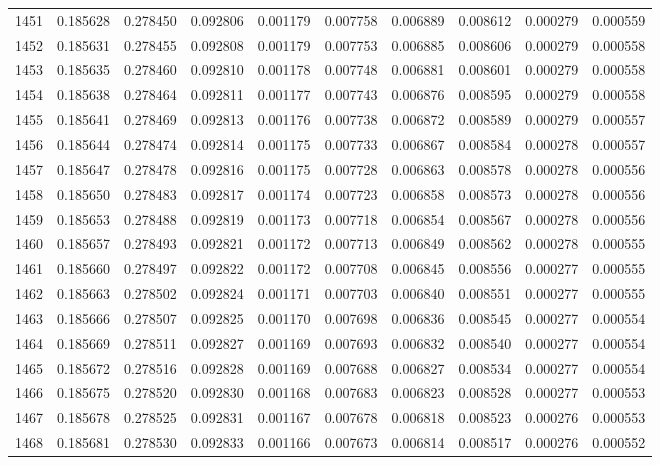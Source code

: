 \begin{tabular}{lrrrrrrrrr}
1451 & 0.185628 & 0.278450 & 0.092806 & 0.001179 & 0.007758 & 0.006889 & 0.008612 & 0.000279 & 0.000559 \\
1452 & 0.185631 & 0.278455 & 0.092808 & 0.001179 & 0.007753 & 0.006885 & 0.008606 & 0.000279 & 0.000558 \\
1453 & 0.185635 & 0.278460 & 0.092810 & 0.001178 & 0.007748 & 0.006881 & 0.008601 & 0.000279 & 0.000558 \\
1454 & 0.185638 & 0.278464 & 0.092811 & 0.001177 & 0.007743 & 0.006876 & 0.008595 & 0.000279 & 0.000558 \\
1455 & 0.185641 & 0.278469 & 0.092813 & 0.001176 & 0.007738 & 0.006872 & 0.008589 & 0.000279 & 0.000557 \\
1456 & 0.185644 & 0.278474 & 0.092814 & 0.001175 & 0.007733 & 0.006867 & 0.008584 & 0.000278 & 0.000557 \\
1457 & 0.185647 & 0.278478 & 0.092816 & 0.001175 & 0.007728 & 0.006863 & 0.008578 & 0.000278 & 0.000556 \\
1458 & 0.185650 & 0.278483 & 0.092817 & 0.001174 & 0.007723 & 0.006858 & 0.008573 & 0.000278 & 0.000556 \\
1459 & 0.185653 & 0.278488 & 0.092819 & 0.001173 & 0.007718 & 0.006854 & 0.008567 & 0.000278 & 0.000556 \\
1460 & 0.185657 & 0.278493 & 0.092821 & 0.001172 & 0.007713 & 0.006849 & 0.008562 & 0.000278 & 0.000555 \\
1461 & 0.185660 & 0.278497 & 0.092822 & 0.001172 & 0.007708 & 0.006845 & 0.008556 & 0.000277 & 0.000555 \\
1462 & 0.185663 & 0.278502 & 0.092824 & 0.001171 & 0.007703 & 0.006840 & 0.008551 & 0.000277 & 0.000555 \\
1463 & 0.185666 & 0.278507 & 0.092825 & 0.001170 & 0.007698 & 0.006836 & 0.008545 & 0.000277 & 0.000554 \\
1464 & 0.185669 & 0.278511 & 0.092827 & 0.001169 & 0.007693 & 0.006832 & 0.008540 & 0.000277 & 0.000554 \\
1465 & 0.185672 & 0.278516 & 0.092828 & 0.001169 & 0.007688 & 0.006827 & 0.008534 & 0.000277 & 0.000554 \\
1466 & 0.185675 & 0.278520 & 0.092830 & 0.001168 & 0.007683 & 0.006823 & 0.008528 & 0.000277 & 0.000553 \\
1467 & 0.185678 & 0.278525 & 0.092831 & 0.001167 & 0.007678 & 0.006818 & 0.008523 & 0.000276 & 0.000553 \\
1468 & 0.185681 & 0.278530 & 0.092833 & 0.001166 & 0.007673 & 0.006814 & 0.008517 & 0.000276 & 0.000552 \\

\end{tabular}
